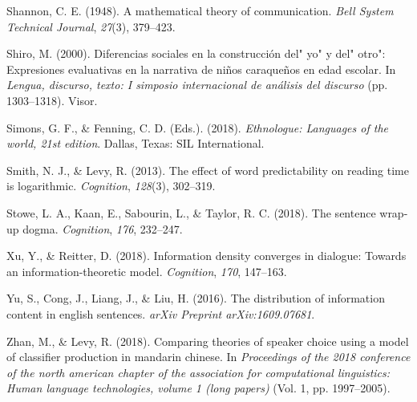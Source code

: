 \documentclass[10pt, letterpaper]{article}
\begin{document}
\leavevmode\hypertarget{ref-shannon1948}{}%
Shannon, C. E. (1948). A mathematical theory of communication.
\emph{Bell System Technical Journal}, \emph{27}(3), 379--423.

\leavevmode\hypertarget{ref-shiro2000}{}%
Shiro, M. (2000). Diferencias sociales en la construcción del" yo" y
del" otro": Expresiones evaluativas en la narrativa de niños caraqueños
en edad escolar. In \emph{Lengua, discurso, texto: I simposio
internacional de análisis del discurso} (pp. 1303--1318). Visor.

\leavevmode\hypertarget{ref-simons2018}{}%
Simons, G. F., \& Fenning, C. D. (Eds.). (2018). \emph{Ethnologue:
Languages of the world, 21st edition}. Dallas, Texas: SIL International.

\leavevmode\hypertarget{ref-smith2013}{}%
Smith, N. J., \& Levy, R. (2013). The effect of word predictability on
reading time is logarithmic. \emph{Cognition}, \emph{128}(3), 302--319.

\leavevmode\hypertarget{ref-stowe2018}{}%
Stowe, L. A., Kaan, E., Sabourin, L., \& Taylor, R. C. (2018). The
sentence wrap-up dogma. \emph{Cognition}, \emph{176}, 232--247.

\leavevmode\hypertarget{ref-xu2018}{}%
Xu, Y., \& Reitter, D. (2018). Information density converges in
dialogue: Towards an information-theoretic model. \emph{Cognition},
\emph{170}, 147--163.

\leavevmode\hypertarget{ref-yu2016}{}%
Yu, S., Cong, J., Liang, J., \& Liu, H. (2016). The distribution of
information content in english sentences. \emph{arXiv Preprint
arXiv:1609.07681}.

\leavevmode\hypertarget{ref-zhan2018}{}%
Zhan, M., \& Levy, R. (2018). Comparing theories of speaker choice using
a model of classifier production in mandarin chinese. In
\emph{Proceedings of the 2018 conference of the north american chapter
of the association for computational linguistics: Human language
technologies, volume 1 (long papers)} (Vol. 1, pp. 1997--2005).


\end{document}
